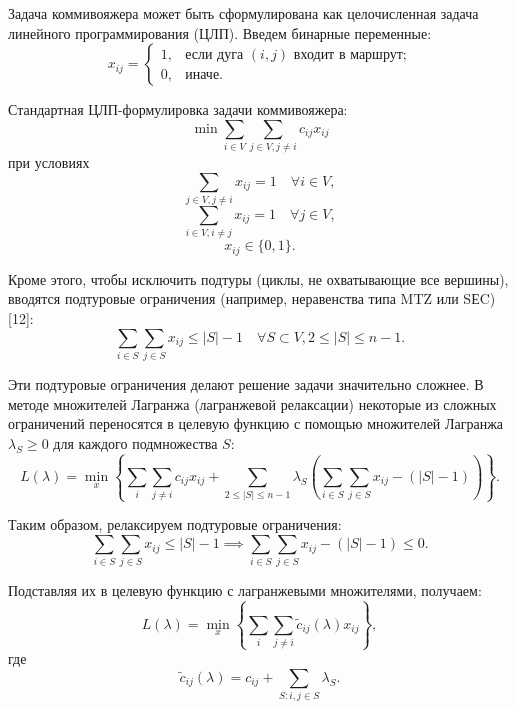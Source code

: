 Задача коммивояжера может быть сформулирована как целочисленная задача линейного программирования (ЦЛП). Введем бинарные переменные:
\begin{equation}
x_{ij} = \begin{cases} 
1, & \text{если дуга $(i,j)$ входит в маршрут;} \\[6pt]
0, & \text{иначе.}
\end{cases}
\end{equation}

Стандартная ЦЛП-формулировка задачи коммивояжера:
\begin{equation}
\min \sum_{i \in V} \sum_{j \in V, j \neq i} c_{ij} x_{ij}
\end{equation}
при условиях
\begin{equation}
\sum_{j \in V, j \neq i} x_{ij} = 1 \quad \forall i \in V,
\end{equation}
\begin{equation}
\sum_{i \in V, i \neq j} x_{ij} = 1 \quad \forall j \in V,
\end{equation}
\begin{equation}
x_{ij} \in \{0,1\}.
\end{equation}

Кроме этого, чтобы исключить подтуры (циклы, не охватывающие все вершины), 
вводятся подтуровые ограничения (например, неравенства типа MTZ или SЕC) [12]:
\begin{equation}
\sum_{i \in S}\sum_{j \in S} x_{ij} \le |S|-1 \quad \forall S \subset V, 2 \le |S| \le n-1.
\end{equation}

Эти подтуровые ограничения делают решение задачи значительно сложнее. 
В методе множителей Лагранжа (лагранжевой релаксации) некоторые из сложных 
ограничений переносятся в целевую функцию с помощью множителей Лагранжа 
$\lambda_S \geq 0$ для каждого подмножества $S$:
\begin{equation}
L(\lambda) = \min_{x} \left\{ \sum_{i}\sum_{j \neq i} c_{ij}x_{ij} 
+ \sum_{2 \le |S| \le n-1} \lambda_S \left( \sum_{i \in S}\sum_{j \in S} x_{ij} -(|S|-1)\right) \right\}.
\end{equation}

Таким образом, релаксируем подтуровые ограничения:
\begin{equation}
\sum_{i \in S}\sum_{j \in S} x_{ij} \le |S|-1 \implies \sum_{i \in S}\sum_{j \in S} x_{ij} -(|S|-1) \le 0.
\end{equation}

Подставляя их в целевую функцию с лагранжевыми множителями, получаем:
\begin{equation}
L(\lambda) = \min_{x} \left\{ \sum_{i}\sum_{j \neq i} \tilde{c}_{ij}(\lambda) x_{ij}\right\},
\end{equation}
где
\begin{equation}
\tilde{c}_{ij}(\lambda) = c_{ij} + \sum_{S: i,j \in S} \lambda_S.
\end{equation}

